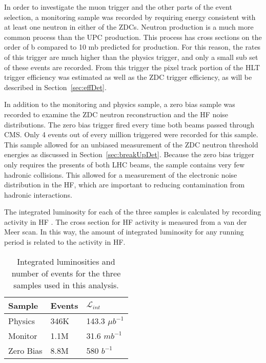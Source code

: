       In order to investigate the muon trigger and the other parts of the event 
        selection, a monitoring sample was recorded by requiring energy 
        consistent with at least one neutron in either of the ZDCs.
      Neutron production is a much more common process than the UPC \JPsi{} 
        production.
      This process has cross sections on the order of \DIFdelbegin {}\DIFdelend \DIFaddbegin {}\DIFaddend b compared
        to 10 mb predicted for \JPsi{} production. 
      For this reason, the rates of this trigger are much higher than the physics
        trigger, and only a small sub set of these events are recorded.
      From this trigger the pixel track portion of the HLT trigger efficiency 
        was estimated as well as the ZDC trigger efficiency, as will be described 
        in Section~\ref{sec:effDet}. 

      In addition to the monitoring and physics sample, a zero bias sample was 
        recorded to examine the ZDC neutron reconstruction and the HF noise 
        distributions. 
      The zero bias trigger fired every time both beams passed through CMS. 
      Only 4 events out of every million triggered were recorded for this sample. 
      This sample allowed for an unbiased measurement of the ZDC neutron 
        threshold energies as discussed in Section~\ref{sec:breakUpDet}. 
      Because the zero bias trigger only requires the presents of both LHC 
        beams, the sample contains very few hadronic collisions. 
      This allowed for a measurement of the electronic noise distribution in
        the HF, which are important to reducing contamination from hadronic
        interactions.

      The integrated luminosity for each of the three samples is calculated
        by recording activity in HF \cite{cmsLumi}. 
      The cross section for HF activity is measured from a van der Meer scan. 
      In this way, the amount of integrated luminosity for any running period is
        related to the activity in HF. 
      \begin{table}
  	    \centering
  	    \begin{tabular}{|l|l|l|}
  	      \hline Sample & Events & $\mathcal{L}_{int}$ \\ \hline \hline
          Physics & 346K & 143.3 $\mu$$b^{-1}$ \\ \hline
          Monitor & 1.1M & 31.6 $mb^{-1}$ \\ \hline
          Zero Bias & 8.8M & 580 $b^{-1}$ \\ \hline 
  	    \end{tabular}
  	    \caption{Integrated luminosities and number of events for the three
  	      samples used in this analysis.}
  	    \label{tab:sampleLumiNevt}
      \end{table}

